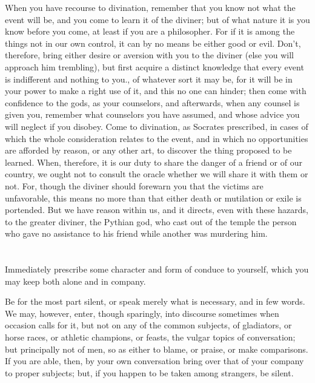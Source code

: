 \documentclass[12pt]{article}
\begin{document}
When you have recourse to divination, remember that you know not
what the event will be, and you come to learn it of the diviner; but
of what nature it is you know before you come, at least if you are
a philosopher. For if it is among the things not in our own control,
it can by no means be either good or evil. Don't, therefore, bring
either desire or aversion with you to the diviner (else you will approach
him trembling), but first acquire a distinct knowledge that every
event is indifferent and nothing to you., of whatever sort it may
be, for it will be in your power to make a right use of it, and this
no one can hinder; then come with confidence to the gods, as your
counselors, and afterwards, when any counsel is given you, remember
what counselors you have assumed, and whose advice you will neglect
if you disobey. Come to divination, as Socrates prescribed, in cases
of which the whole consideration relates to the event, and in which
no opportunities are afforded by reason, or any other art, to discover
the thing proposed to be learned. When, therefore, it is our duty
to share the danger of a friend or of our country, we ought not to
consult the oracle whether we will share it with them or not. For,
though the diviner should forewarn you that the victims are unfavorable,
this means no more than that either death or mutilation or exile is
portended. But we have reason within us, and it directs, even with
these hazards, to the greater diviner, the Pythian god, who cast out
of the temple the person who gave no assistance to his friend while
another was murdering him. 

\section{}

Immediately prescribe some character and form of conduce to yourself,
which you may keep both alone and in company. 

Be for the most part silent, or speak merely what is necessary, and
in few words. We may, however, enter, though sparingly, into discourse
sometimes when occasion calls for it, but not on any of the common
subjects, of gladiators, or horse races, or athletic champions, or
feasts, the vulgar topics of conversation; but principally not of
men, so as either to blame, or praise, or make comparisons. If you
are able, then, by your own conversation bring over that of your company
to proper subjects; but, if you happen to be taken among strangers,
be silent. 
\end{document}
